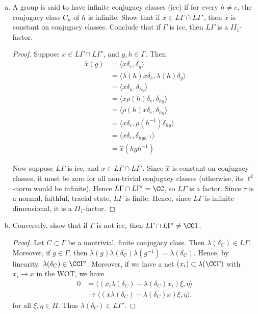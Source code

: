 \documentclass{article}
\begin{document}
\begin{enumerate}[(a)]
\begin{proof}
  \end{proof}
\item A group is said to have infinite conjugacy classes (icc) if for every $h \neq e$, the conjugacy class $C_h$ of $h$ is infinite. Show that if $x \in L \Gamma \cap L \Gamma'$, then $\hat{x}$ is constant on conjugacy classes. Conclude that if $\Gamma$ is icc, then $L\Gamma$ is a $II_1$-factor.
  \begin{proof}
    Suppose $x \in L\Gamma \cap L\Gamma'$, and $g,h \in \Gamma$.  Then
    \begin{align*}
    \hat{x}(g) & = \langle x \delta_e , \delta_g \rangle \\
    & = \langle \lambda(h) x \delta_e , \lambda(h) \delta_g \rangle \\
    & = \langle x \delta_h , \delta_{hg} \rangle \\
    & = \langle x \rho(h) \delta_{e}, \delta_{hg} \rangle \\
    & = \langle \rho(h) x \delta_{e}, \delta_{hg} \rangle \\
    & = \langle x \delta_{e}, \rho(h^{-1}) \delta_{hg} \rangle \\
    & = \langle x \delta_{e},  \delta_{hgh^{-1}} \rangle \\
    & = \hat{x}(hgh^{-1})
    \end{align*}

    Now suppose $L \Gamma$ is icc, and $x \in L \Gamma \cap L \Gamma'$.  Since $\hat{x}$ is constant on conjugacy classes, it must be zero for all non-trivial conjugacy classes (otherwise, its $\ell^2$-norm would be infinite).  Hence $L \Gamma \cap L \Gamma' = \CC$, so $L \Gamma$ is a factor. Since $\tau$ is a normal, faithful, tracial state, $L \Gamma$ is finite. Hence, since $L \Gamma$ is infinite dimensional, it is a $II_1$-factor.
\end{proof}
  
\item Conversely, show that if $\Gamma$ is not icc, then $L\Gamma \cap L\Gamma' \neq \CC 1$.
  \begin{proof}
    Let $C \subset \Gamma$ be a nontrivial, finite conjugacy class.  Then $\lambda(\delta_C) \in L\Gamma$.  Moreover, if $g \in \Gamma$, then $\lambda(g) \lambda(\delta_C) \lambda(g^{-1}) = \lambda(\delta_C)$.  Hence, by linearity, $\lambda(\delta_C) \in \CC \Gamma'$.  Moreover, if we have a net $(x_i) \subset \lambda(\CC \Gamma)$ with $x_i \to x$ in the WOT, we have
    \begin{align*}
      0 & = \langle (x_i \lambda(\delta_C) - \lambda(\delta_C) x_i) \xi, \eta \rangle \\
      & \to  \langle (x \lambda(\delta_C)  -  \lambda(\delta_C) x )\xi, \eta \rangle,
    \end{align*}
    for all $\xi, \eta \in H$.  Thus $\lambda(\delta_C) \in L\Gamma'$.
  \end{proof}
\end{enumerate}
\end{document}
